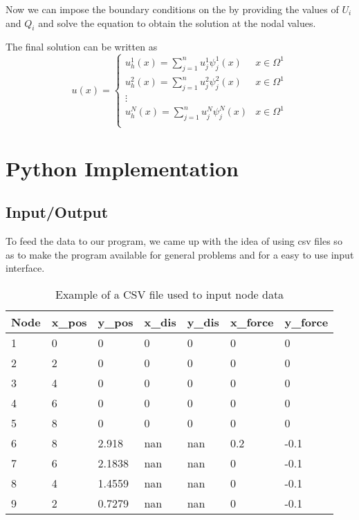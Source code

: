 Now we can impose the boundary conditions on the by providing the values of $U_i$ and $Q_i$ and solve the equation to obtain the solution at the nodal values.

The final solution can be written as
\[ u(x) = \begin{cases} 
	u_h^1(x) = \sum_{j=1}^{n} u_j^1 \psi_j^1(x)& x \in \Omega^1 \\
	u_h^2(x) = \sum_{j=1}^{n} u_j^2 \psi_j^2(x)& x \in \Omega^1 \\
	\vdots\\
	u_h^N(x) = \sum_{j=1}^{n} u_j^N \psi_j^N(x)& x \in \Omega^1 \\
\end{cases}
\]





\pagebreak

\section{\bf Python Implementation}

\subsection{Input/Output}
To feed the data to our program, we came up with the idea of using csv files so as to make the program available for general problems and for a easy to use input interface.\\


\begin{table}[h!]
	\centering
	\begin{tabular}{|l|l|l|l|l|l|l|}
		\hline
		Node & x\_pos & y\_pos & x\_dis & y\_dis & x\_force & y\_force \\
		\hline
		1    & 0      & 0      & 0      & 0      & 0        & 0        \\
		2    & 2      & 0      & 0      & 0      & 0        & 0        \\
		3    & 4      & 0      & 0      & 0      & 0        & 0        \\
		4    & 6      & 0      & 0      & 0      & 0        & 0        \\
		5    & 8      & 0      & 0      & 0      & 0        & 0        \\
		6    & 8      & 2.918  & nan    & nan    & 0.2      & -0.1     \\
		7    & 6      & 2.1838 & nan    & nan    & 0        & -0.1     \\
		8    & 4      & 1.4559 & nan    & nan    & 0        & -0.1     \\
		9    & 2      & 0.7279 & nan    & nan    & 0        & -0.1  	\\
		\hline  
	\end{tabular}
		\caption{Example of a CSV file used to input node data}
	\label{node_csv_table}
\end{table}

